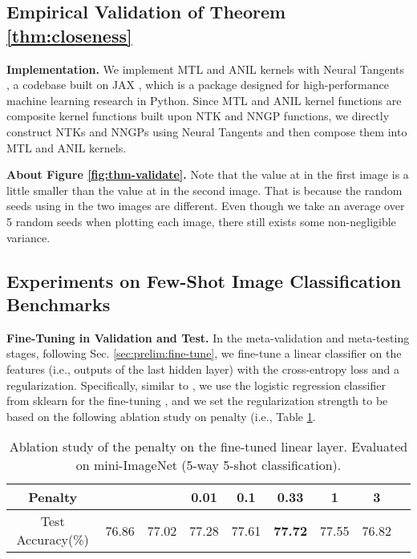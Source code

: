\documentclass{article}
\begin{document}
\subsection{Empirical Validation of Theorem \ref{thm:closeness}}\label{supp:exp:theory-validate}

\textbf{Implementation.} We implement MTL and ANIL kernels with Neural Tangents \cite{neuraltangents2020}, a codebase built on JAX \cite{jax2018github}, which is a package designed for high-performance machine learning research in Python. Since MTL and ANIL kernel functions are composite kernel functions built upon NTK and NNGP functions, we directly construct NTKs and NNGPs using Neural Tangents and then compose them into MTL and ANIL kernels. 


\textbf{About Figure \ref{fig:thm-validate}.} Note that the value at  in the first image is a little smaller than the value at  in the second image. That is because the random seeds using in the two images are different. Even though we take an average over 5 random seeds when plotting each image, there still exists some non-negligible variance. 

\subsection{Experiments on Few-Shot Image Classification Benchmarks} \label{supp:exp:few-shot}



\textbf{Fine-Tuning in Validation and Test.} In the meta-validation and meta-testing stages, following Sec. \ref{sec:prelim:fine-tune}, we fine-tune a linear classifier on the features (i.e., outputs of the last hidden layer) with the cross-entropy loss and a  regularization. Specifically, similar to \citet{tian2020rethink}, we use the logistic regression classifier from sklearn for the fine-tuning \cite{sklearn}, and we set the  regularization strength to be  based on the following ablation study on  penalty (i.e., Table \ref{tab:l2}.
\begin{table}[b]
    \centering
    \setlength\tabcolsep{1.7pt}
    \begin{tabular}{c c c c c c c c c}
{\small  Penalty}  &\small & \small{}& \small{0.01}& \small{0.1} & \small{0.33} & \small{1} & \small{3}\\
        \midrule
        {\small Test Accuracy(\%)} & \small 76.86 & \small 77.02 & \small 77.28 & \small 77.61 &\small \textbf{77.72} & \small 77.55 &\small 76.82\\
\end{tabular}
    \caption{Ablation study of the  penalty on the fine-tuned linear layer. Evaluated on mini-ImageNet (5-way 5-shot classification).
}\label{tab:l2}
\end{table}    

\nocite{finn2019online,provable-gbml,adaptive-GBML,hu2020biased,xu2020meta}
\nocite{maml_nonconvex,ji2020multistep,imaml,zhou2019metalearning}
\end{document}
